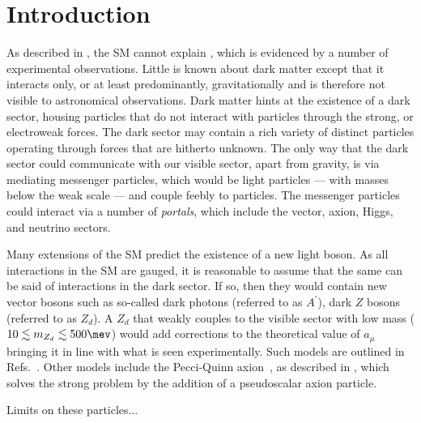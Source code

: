\section{Introduction}
\label{sec:db:intro}

As described in , the SM cannot explain \dm, which is evidenced by a
number of experimental observations.
Little is known about dark matter except that it interacts only, or at least predominantly,
gravitationally and is therefore not visible to astronomical observations.
Dark matter hints at the existence of a dark sector, housing particles that do not interact with
\sm particles through the strong, or electroweak forces.
The dark sector may contain a rich variety of distinct particles operating through forces that are
hitherto unknown.
The only way that the dark sector could communicate with our visible sector, apart from gravity,
is via mediating messenger particles, which would be light particles --- with masses below the weak scale ---
and couple feebly to \sm particles.
The messenger particles could interact via a number of \emph{portals}, which include the vector,
axion, Higgs, and neutrino sectors.


Many extensions of the SM predict the existence of a new light boson.
As all interactions in the SM are gauged, it is reasonable to assume that the same can be said of
interactions in the dark sector.
If so, then they would contain new vector bosons such as so-called dark photons (referred to as
$A^{\prime}$), dark $Z$ bosons (referred to as $Z_d$).
A $Z_d$ that weakly couples to the visible sector with low mass
($10\lesssim m_{Z_d}\lesssim500\mev$) would add corrections to the theoretical value of $a_\mu$
bringing it in line with what is seen experimentally.
Such models are outlined in Refs.~\cite{Davoudiasl:2012qa,Davoudiasl:2012ag,Lee:2014lga}.
Other models include the Pecci-Quinn axion~\cite{PhysRevLett.38.1440}, as described in ,
which solves the strong \CP problem by the addition of a pseudoscalar axion particle.

Limits on these particles...

